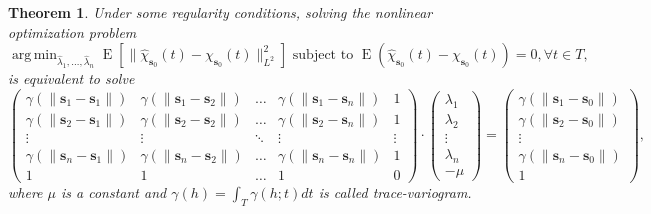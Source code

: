 \documentclass[
  12pt,
]{article}
\newtheorem{theorem}{Theorem}[section]
\theoremstyle{definition}
\theoremstyle{definition}
\theoremstyle{definition}
\theoremstyle{remark}
\begin{document}
\begin{theorem}
\protect\hypertarget{thm:sistLinear}{}{\label{thm:sistLinear} }Under some regularity conditions, solving the nonlinear optimization problem
\begin{equation*}
    \mathop{\mathrm{arg\,min}}_{\hat{\lambda}_1, \dots, \hat{\lambda}_{n}} \mathop{\mathrm{E}}\left[ \lVert\hat{\chi}_{\bm{s}_0}(t) - \chi_{\bm{s}_0}(t) \rVert_{L^2}^2\right] \mbox{ subject to }\mathop{\mathrm{E}}(\hat{\chi}_{\bm{s}_0}(t) - \chi_{\bm{s}_0}(t)) =0, \forall t \in T,
    \end{equation*}
is equivalent to solve
\begin{equation*}
    \begin{pmatrix}
    \gamma(\lVert\bm{s}_1 - \bm{s}_1\rVert) & \gamma(\lVert\bm{s}_1 - \bm{s}_2\rVert) & \dots & \gamma(\lVert\bm{s}_{1} - \bm{s}_n\rVert) & 1\\
    \gamma(\lVert\bm{s}_2 - \bm{s}_1\rVert) & \gamma(\lVert\bm{s}_2 - \bm{s}_2\rVert) & \dots & \gamma(\lVert\bm{s}_{2} - \bm{s}_n\rVert) & 1\\
    \vdots & \vdots & \ddots & \vdots &\vdots\\
    \gamma(\lVert\bm{s}_{n} - \bm{s}_1\rVert) & \gamma(\lVert\bm{s}_{n} - \bm{s}_2\rVert) & \dots & \gamma(\lVert\bm{s}_{n} - \bm{s}_{n}\rVert) & 1\\
    1 & 1 & \dots & 1 & 0
    \end{pmatrix}
    \cdot
    \begin{pmatrix}
    \lambda_1\\
    \lambda_2\\
    \vdots\\
    \lambda_{n}\\
    -\mu
    \end{pmatrix}
    =
    \begin{pmatrix}
    \gamma(\lVert\bm{s}_1 - \bm{s}_0\rVert)\\
    \gamma(\lVert\bm{s}_2 - \bm{s}_0\rVert)\\
    \vdots\\
    \gamma(\lVert\bm{s}_{n}- \bm{s}_0\rVert)\\
    1
    \end{pmatrix},
    \end{equation*}
where \(\mu\) is a constant and \(\gamma(h) = \int_T \gamma(h;t)dt\) is called trace-variogram.
\end{theorem}
\end{document}
